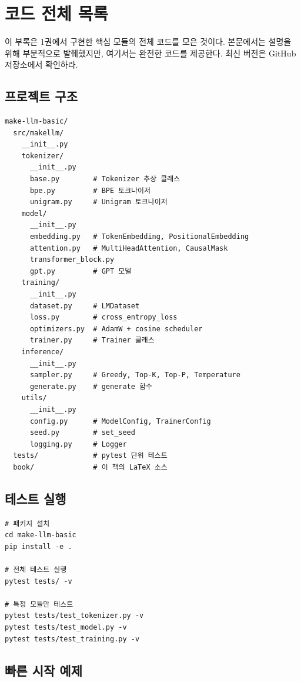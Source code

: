 \chapter{코드 전체 목록}
\label{app:code}

이 부록은 1권에서 구현한 핵심 모듈의 전체 코드를 모은 것이다. 본문에서는 설명을 위해 부분적으로 발췌했지만, 여기서는 완전한 코드를 제공한다. 최신 버전은 GitHub 저장소에서 확인하라.

\section{프로젝트 구조}

\begin{lstlisting}[style=bashstyle]
make-llm-basic/
  src/makellm/
    __init__.py
    tokenizer/
      __init__.py
      base.py        # Tokenizer 추상 클래스
      bpe.py         # BPE 토크나이저
      unigram.py     # Unigram 토크나이저
    model/
      __init__.py
      embedding.py   # TokenEmbedding, PositionalEmbedding
      attention.py   # MultiHeadAttention, CausalMask
      transformer_block.py
      gpt.py         # GPT 모델
    training/
      __init__.py
      dataset.py     # LMDataset
      loss.py        # cross_entropy_loss
      optimizers.py  # AdamW + cosine scheduler
      trainer.py     # Trainer 클래스
    inference/
      __init__.py
      sampler.py     # Greedy, Top-K, Top-P, Temperature
      generate.py    # generate 함수
    utils/
      __init__.py
      config.py      # ModelConfig, TrainerConfig
      seed.py        # set_seed
      logging.py     # Logger
  tests/             # pytest 단위 테스트
  book/              # 이 책의 LaTeX 소스
\end{lstlisting}

\section{테스트 실행}

\begin{lstlisting}[style=bashstyle]
# 패키지 설치
cd make-llm-basic
pip install -e .

# 전체 테스트 실행
pytest tests/ -v

# 특정 모듈만 테스트
pytest tests/test_tokenizer.py -v
pytest tests/test_model.py -v
pytest tests/test_training.py -v
\end{lstlisting}

\section{빠른 시작 예제}


